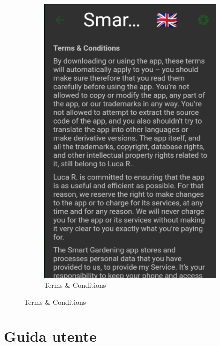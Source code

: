 \documentclass[a4paper,12pt]{report}
\begin{document}
\begin{figure}[H]
\begin{subfigure}{0.3\textwidth}
		\includegraphics[width=\textwidth]{./images/terms_and_conditions/terms_and_conditions_screen.png}
		\caption{Terms \& Conditions}
		\label{fig:terms_and_conditions}
	\end{subfigure}
\end{figure}
	
	
\newpage

\section{Guida utente}
\end{document}
